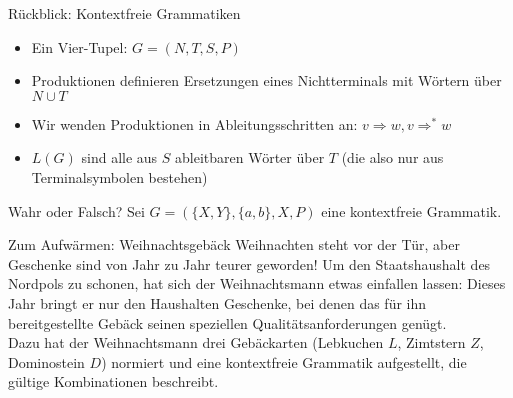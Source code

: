 





\usepackage{tikz}
\usetikzlibrary{arrows}
   \usetikzlibrary{automata}
   \usetikzlibrary{matrix}
\usepackage{url}

\graphicspath{{../figures/}}





\framePrevEpisode

\begin{frame}{Rückblick: Kontextfreie Grammatiken}
	\begin{itemize}[<+->]
		\item Ein Vier-Tupel: $G = (N, T, S, P)$
		\item Produktionen definieren Ersetzungen eines Nichtterminals mit Wörtern über $N \cup T$
		\item Wir wenden Produktionen in Ableitungsschritten an: $v \Rightarrow w, v \Rightarrow^* w$
		\item $L(G)$ sind alle aus $S$ ableitbaren Wörter über $T$ (die also nur aus Terminalsymbolen bestehen)
	\end{itemize}
\end{frame}

\begin{frame}{Wahr oder Falsch?}
	Sei $G=(\{X,Y\},\{a,b\},X,P)$ eine kontextfreie Grammatik.
	\begin{itemize}
			\end{itemize}
\end{frame}

\begin{frame}{Zum Aufwärmen: Weihnachtsgebäck}
	Weihnachten steht vor der Tür, aber Geschenke sind von Jahr zu Jahr teurer geworden! Um den Staatshaushalt des Nordpols zu schonen, hat sich der Weihnachtsmann etwas einfallen lassen: Dieses Jahr bringt er nur den Haushalten Geschenke, bei denen das für ihn bereitgestellte Gebäck seinen speziellen Qualitätsanforderungen genügt.\\[1em]
	
	Dazu hat der Weihnachtsmann drei Gebäckarten (Lebkuchen $L$, Zimtstern $Z$, Dominostein $D$) normiert und eine kontextfreie Grammatik aufgestellt, die gültige Kombinationen beschreibt.
\end{frame}


